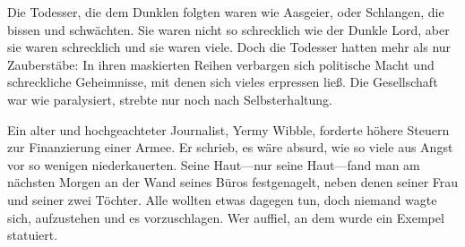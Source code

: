 Die Todesser, die dem Dunklen folgten waren wie Aasgeier, oder Schlangen, die bissen und schwächten. Sie waren nicht so schrecklich wie der Dunkle Lord, aber sie waren schrecklich und sie waren viele. Doch die Todesser hatten mehr als nur Zauberstäbe: In ihren maskierten Reihen verbargen sich politische Macht und schreckliche Geheimnisse, mit denen sich vieles erpressen ließ. Die Gesellschaft war wie paralysiert, strebte nur noch nach Selbsterhaltung.

Ein alter und hochgeachteter Journalist, Yermy Wibble, forderte höhere Steuern zur Finanzierung einer Armee. Er schrieb, es wäre absurd, wie so viele aus Angst vor so wenigen niederkauerten. Seine Haut—nur seine Haut—fand man am nächsten Morgen an der Wand seines Büros festgenagelt, neben denen seiner Frau und seiner zwei Töchter. Alle wollten etwas dagegen tun, doch niemand wagte sich, aufzustehen und es vorzuschlagen. Wer auffiel, an dem wurde ein Exempel statuiert.

